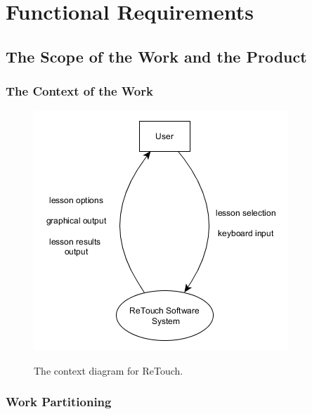 \documentclass[12pt, titlepage]{article}
\begin{document}
\section{Functional Requirements}

\subsection{The Scope of the Work and the Product}

\subsubsection{The Context of the Work}

\begin{figure}[h!]
	\includegraphics[scale=0.75]{ContextDiagram.jpg}
	\centering
	\label{figure:1}	
	\caption{The context diagram for ReTouch.}
\end{figure}

\subsubsection{Work Partitioning}
\end{document}
